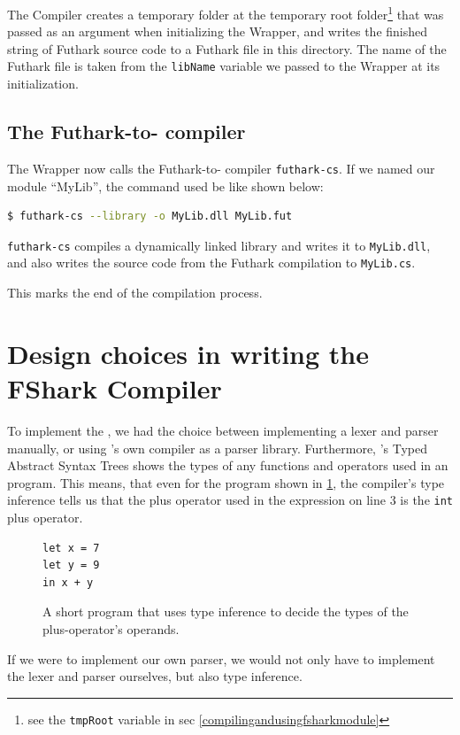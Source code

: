 The \fshark{}Compiler creates a temporary folder at the temporary root folder\footnote{see the \texttt{tmpRoot} variable in sec \ref{compilingandusingfsharkmodule}}
that was passed as an argument when initializing the \fshark{}Wrapper, and
writes the finished string of Futhark source code to a Futhark file in this
directory.
The name of the Futhark file is taken from the \texttt{libName} variable we
passed to the \fshark{}Wrapper at its initialization.

\subsection{The Futhark-to-\csharp{} compiler}
The \fshark{}Wrapper now calls the Futhark-to-\csharp{} compiler
\texttt{futhark-cs}. If we named our \fshark{} module ``MyLib'', the command
used be like shown below:\\
\begin{lstlisting}[language=sh]
$ futhark-cs --library -o MyLib.dll MyLib.fut
\end{lstlisting}

\texttt{futhark-cs} compiles a \csharp{} dynamically linked library and writes
it to \texttt{MyLib.dll}, and also writes the \csharp{} source code from the
Futhark compilation to \texttt{MyLib.cs}.

This marks the end of the \fshark{} compilation process.


\section{Design choices in writing the FShark Compiler}
To implement the \fsharkcompiler{}, we had the choice between implementing a
lexer and parser manually, or using \fsharp{}'s own compiler as a parser library.
Furthermore, \fsharp{}'s Typed Abstract Syntax Trees shows the types of any
functions and operators used in an \fsharp{} program. This means, that even for
the program shown in \ref{fig:shortprogrammmm}, the \fsharp{} compiler's type
inference tells us that the plus operator used in the expression on line 3 is
the \texttt{int} plus operator.

\begin{figure}[H]
  \centering
\begin{verbatim}
let x = 7
let y = 9
in x + y
\end{verbatim}
  \caption{A short \fsharp{} program that uses type inference to decide the
    types of the plus-operator's operands.}
  \label{fig:shortprogrammmm}
\end{figure}
If we were to implement our own \fsharp{} parser, we would not only have to
implement the lexer and parser ourselves, but also type inference.


